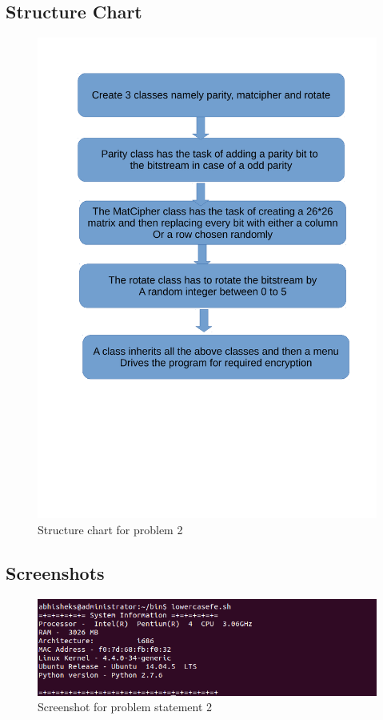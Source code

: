 \documentclass[11pt]{report}
\begin{document}
	\subsection{Structure Chart}
	\begin{figure}[h!]
	\centering
	\includegraphics[scale=0.7]{images/shots22}
	\caption{Structure chart for problem 2}	
	\end{figure}
	\pagebreak
	\subsection{Screenshots}
	\begin{figure}[h!]
	\centering
	\includegraphics[scale=0.8, center]{images/screenshot2}
	\caption{Screenshot for problem statement 2}
	\end{figure}
	\pagebreak
\end{document}
